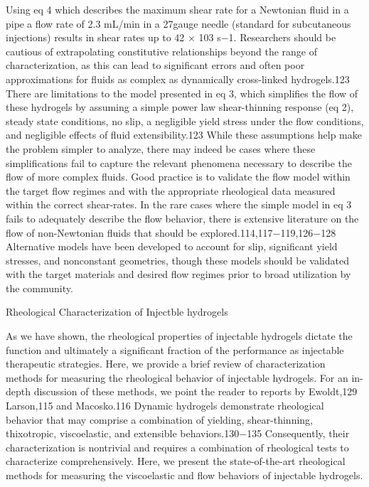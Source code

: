 \documentclass[../../main-notes.tex]{subfiles}
\begin{document}
Using eq 4 which describes the maximum shear rate for a Newtonian fluid in a pipea flow rate of 2.3 mL/min in a 27gauge needle (standard for subcutaneous injections) results in  shear rates up to 42 × 103 s−1. 
Researchers should be cautious of extrapolating constitutive relationships beyond the range of characterization, as this can lead to significant errors and often poor approximations for fluids as complex as dynamically  cross-linked hydrogels.123 
There are limitations to the model presented in eq 3, which simplifies the flow of these hydrogels by assuming a simple power law shear-thinning response (eq 2), steady state conditions, no slip, a negligible yield stress under the flow  conditions, and negligible effects of fluid extensibility.123 
While these assumptions help make the problem simpler to analyze, there may indeed be cases where these simplifications fail to capture the relevant phenomena necessary to describe the flow of more complex fluids. 
Good practice is to validate the flow model within the target flow regimes and with the appropriate rheological data measured within the correct shear-rates. 
In the rare cases where the simple model in eq 3 fails to adequately describe the flow behavior, there is extensive literature on the flow of non-Newtonian fluids that should be explored.114,117−119,126−128 
Alternative models have been developed to account for slip, significant yield stresses, and nonconstant geometries, though these models should be validated with the target materials and desired flow regimes prior to broad utilization by the community.


Rheological Characterization of Injectble hydrogels

As we have shown, the rheological properties of injectable hydrogels dictate the function and ultimately a significant fraction of the performance as injectable therapeutic strategies. 
Here, we provide a brief review of characterization methods for measuring the rheological behavior of injectable hydrogels. 
For an in-depth discussion of these methods, we point the reader  to reports by Ewoldt,129 Larson,115 and Macosko.116 
Dynamic hydrogels demonstrate rheological behavior that may comprise a combination of yielding, shear-thinning, thixotropic,  viscoelastic, and extensible behaviors.130−135 
Consequently, their characterization is nontrivial and requires a combination of rheological tests to characterize comprehensively. 
Here, we present the state-of-the-art rheological methods for measuring the viscoelastic and flow behaviors of injectable hydrogels.
\end{document}

